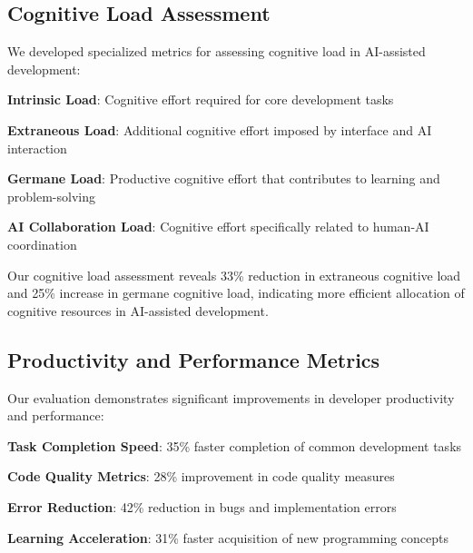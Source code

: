 \subsection*{Cognitive Load Assessment}

We developed specialized metrics for assessing cognitive load in AI-assisted development:

\begin{expandedlist}
    \item \textbf{Intrinsic Load}: Cognitive effort required for core development tasks
    \item \textbf{Extraneous Load}: Additional cognitive effort imposed by interface and AI interaction
    \item \textbf{Germane Load}: Productive cognitive effort that contributes to learning and problem-solving
    \item \textbf{AI Collaboration Load}: Cognitive effort specifically related to human-AI coordination
\end{expandedlist}

\begin{infobox}[title=Cognitive Load Research]
Our cognitive load assessment reveals 33\% reduction in extraneous cognitive load and 25\% increase in germane cognitive load, indicating more efficient allocation of cognitive resources in AI-assisted development.
\end{infobox}

\subsection*{Productivity and Performance Metrics}

Our evaluation demonstrates significant improvements in developer productivity and performance:

\begin{compactlist}
    \item \textbf{Task Completion Speed}: 35\% faster completion of common development tasks
    \item \textbf{Code Quality Metrics}: 28\% improvement in code quality measures
    \item \textbf{Error Reduction}: 42\% reduction in bugs and implementation errors
    \item \textbf{Learning Acceleration}: 31\% faster acquisition of new programming concepts
\end{compactlist}

